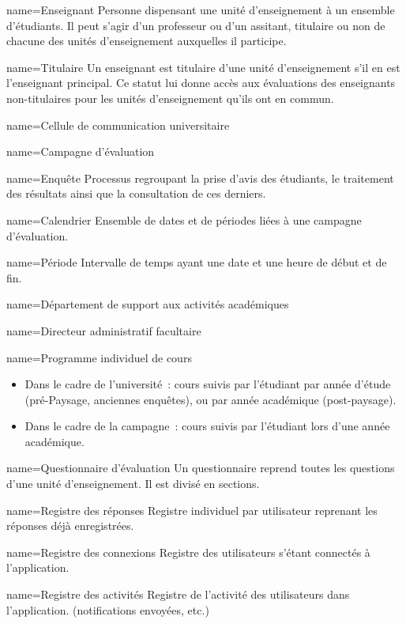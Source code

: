 	{name=Enseignant}
	{Personne dispensant une unité d'enseignement à un ensemble d'étudiants.
	Il peut s'agir d'un professeur ou d'un assitant, titulaire ou non de chacune des unités d'enseignement auxquelles il participe.}

	{name=Titulaire}
	{Un enseignant est titulaire d'une unité d'enseignement s'il en est l'enseignant principal.
	Ce statut lui donne accès aux évaluations des enseignants non-titulaires pour les unités d'enseignement qu'ils ont en commun.}

	{name=Cellule de communication universitaire}
	{}

	{name=Campagne d'évaluation}
	{}


	{name=Enquête}
	{Processus regroupant la prise d'avis des étudiants, le traitement des résultats ainsi que la consultation de ces derniers.}

	{name=Calendrier}
	{Ensemble de dates et de périodes liées à une campagne d'évaluation.}

	{name=Période}
	{Intervalle de temps ayant une date et une heure de début et de fin.}

	{name=Département de support aux activités académiques}


	{name=Directeur administratif facultaire}
	{}


	{name=Programme individuel de cours}
	{
	\begin{itemize}
		\item Dans le cadre de l'université~: cours suivis par l'étudiant par année d'étude (pré-Paysage, anciennes enquêtes), ou par année académique (post-paysage).
		\item Dans le cadre de la campagne~: cours suivis par l'étudiant lors d'une année académique.
	\end{itemize}
	}


	{name=Questionnaire d'évaluation}
	{Un questionnaire reprend toutes les questions d'une unité d'enseignement.
	Il est divisé en sections.}

	{name=Registre des réponses}
	{Registre individuel par utilisateur reprenant les réponses déjà enregistrées.}

	{name=Registre des connexions}
	{Registre des utilisateurs s'étant connectés à l'application.}

	{name=Registre des activités}
	{Registre de l'activité des utilisateurs dans l'application. (notifications envoyées, etc.)}

